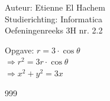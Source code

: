 \documentclass[a4paper]{article}
\begin{document}
  
\noindent \large Auteur: Etienne El Hachem \\
\noindent \large Studierichting: Informatica\\
\noindent \large Oefeningenreeks 3H nr. 2.2\\

\medskip

\normalsize

Opgave: $ r = 3\cdot\cos\theta$ \\

$\Rightarrow r^2 = 3r\cdot\cos\theta$ \\

$\Rightarrow x^2 + y^2 = 3x$

\begin{thebibliography}{999}
\end{thebibliography}
\end{document}
